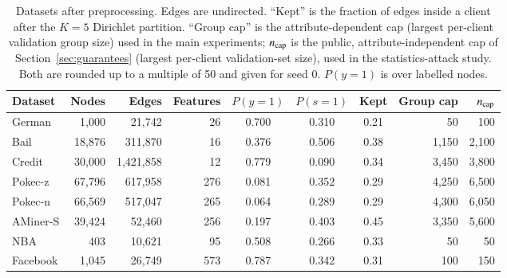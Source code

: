 \begin{table}[t]
\centering
\small
\caption{Datasets after preprocessing. Edges are undirected. ``Kept'' is the fraction of edges inside a client after the $K=5$ Dirichlet partition. ``Group cap'' is the attribute-dependent cap (largest per-client validation group size) used in the main experiments; $n_{\mathrm{cap}}$ is the public, attribute-independent cap of Section~\ref{sec:guarantees} (largest per-client validation-set size), used in the statistics-attack study. Both are rounded up to a multiple of 50 and given for seed 0. $P(y{=}1)$ is over labelled nodes.}\label{tab:data}
\begin{tabular}{lrrrcccrr}
\toprule
Dataset & Nodes & Edges & Features & $P(y{=}1)$ & $P(s{=}1)$ & Kept & Group cap & $n_{\mathrm{cap}}$ \\
\midrule
German   & 1{,}000  & 21{,}742      & 26  & 0.700 & 0.310 & 0.21 & 50 & 100 \\
Bail     & 18{,}876 & 311{,}870     & 16  & 0.376 & 0.506 & 0.38 & 1{,}150 & 2{,}100 \\
Credit   & 30{,}000 & 1{,}421{,}858 & 12  & 0.779 & 0.090 & 0.34 & 3{,}450 & 3{,}800 \\
Pokec-z  & 67{,}796 & 617{,}958     & 276 & 0.081 & 0.352 & 0.29 & 4{,}250 & 6{,}500 \\
Pokec-n  & 66{,}569 & 517{,}047     & 265 & 0.064 & 0.289 & 0.29 & 4{,}300 & 6{,}050 \\
AMiner-S & 39{,}424 & 52{,}460      & 256 & 0.197 & 0.403 & 0.45 & 3{,}350 & 5{,}600 \\
NBA      & 403      & 10{,}621      & 95  & 0.508 & 0.266 & 0.33 & 50 & 50 \\
Facebook & 1{,}045  & 26{,}749      & 573 & 0.787 & 0.342 & 0.31 & 100 & 150 \\
\bottomrule
\end{tabular}
\end{table}

